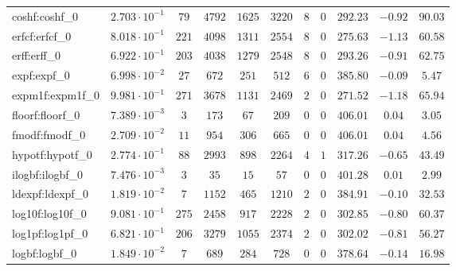 \begin{tabular}{|l|c|c|c|c|c|c|c|c|c|c|}
coshf:coshf\_0               & $ 2.703 \cdot 10^{-1} $ & $ 79     $ & $ 4792  $ & $ 1625  $ & $ 3220  $ & $ 8   $ & $ 0 $ & $ 292.23      $ & $ -0.92   $ & $ 90.03   $ \\
erfcf:erfcf\_0               & $ 8.018 \cdot 10^{-1} $ & $ 221    $ & $ 4098  $ & $ 1311  $ & $ 2554  $ & $ 8   $ & $ 0 $ & $ 275.63      $ & $ -1.13   $ & $ 60.58   $ \\
erff:erff\_0                 & $ 6.922 \cdot 10^{-1} $ & $ 203    $ & $ 4038  $ & $ 1279  $ & $ 2548  $ & $ 8   $ & $ 0 $ & $ 293.26      $ & $ -0.91   $ & $ 62.75   $ \\
expf:expf\_0                 & $ 6.998 \cdot 10^{-2} $ & $ 27     $ & $ 672   $ & $ 251   $ & $ 512   $ & $ 6   $ & $ 0 $ & $ 385.80      $ & $ -0.09   $ & $ 5.47    $ \\
expm1f:expm1f\_0             & $ 9.981 \cdot 10^{-1} $ & $ 271    $ & $ 3678  $ & $ 1131  $ & $ 2469  $ & $ 2   $ & $ 0 $ & $ 271.52      $ & $ -1.18   $ & $ 65.94   $ \\
floorf:floorf\_0             & $ 7.389 \cdot 10^{-3} $ & $ 3      $ & $ 173   $ & $ 67    $ & $ 209   $ & $ 0   $ & $ 0 $ & $ 406.01      $ & $ 0.04    $ & $ 3.05    $ \\
fmodf:fmodf\_0               & $ 2.709 \cdot 10^{-2} $ & $ 11     $ & $ 954   $ & $ 306   $ & $ 665   $ & $ 0   $ & $ 0 $ & $ 406.01      $ & $ 0.04    $ & $ 4.56    $ \\
hypotf:hypotf\_0             & $ 2.774 \cdot 10^{-1} $ & $ 88     $ & $ 2993  $ & $ 898   $ & $ 2264  $ & $ 4   $ & $ 1 $ & $ 317.26      $ & $ -0.65   $ & $ 43.49   $ \\
ilogbf:ilogbf\_0             & $ 7.476 \cdot 10^{-3} $ & $ 3      $ & $ 35    $ & $ 15    $ & $ 57    $ & $ 0   $ & $ 0 $ & $ 401.28      $ & $ 0.01    $ & $ 2.99    $ \\
ldexpf:ldexpf\_0             & $ 1.819 \cdot 10^{-2} $ & $ 7      $ & $ 1152  $ & $ 465   $ & $ 1210  $ & $ 2   $ & $ 0 $ & $ 384.91      $ & $ -0.10   $ & $ 32.53   $ \\
log10f:log10f\_0             & $ 9.081 \cdot 10^{-1} $ & $ 275    $ & $ 2458  $ & $ 917   $ & $ 2228  $ & $ 2   $ & $ 0 $ & $ 302.85      $ & $ -0.80   $ & $ 60.37   $ \\
log1pf:log1pf\_0             & $ 6.821 \cdot 10^{-1} $ & $ 206    $ & $ 3279  $ & $ 1055  $ & $ 2374  $ & $ 2   $ & $ 0 $ & $ 302.02      $ & $ -0.81   $ & $ 56.27   $ \\
logbf:logbf\_0               & $ 1.849 \cdot 10^{-2} $ & $ 7      $ & $ 689   $ & $ 284   $ & $ 728   $ & $ 0   $ & $ 0 $ & $ 378.64      $ & $ -0.14   $ & $ 16.98   $ \\

\end{tabular}

